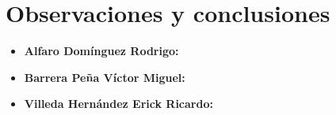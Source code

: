 \section{Observaciones y conclusiones}

\begin{itemize}
	\item \textbf{Alfaro Domínguez Rodrigo:}
	\item \textbf{Barrera Peña Víctor Miguel:} 
	\item \textbf{Villeda Hernández Erick Ricardo:}
	
\end{itemize}